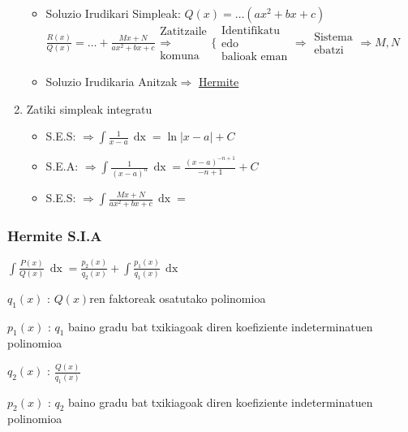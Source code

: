 \documentclass[8pt]{article}
\DeclareMathOperator{\xder}{\, \mathrm{d}x}
\begin{document}
\begin{enumerate}
\begin{itemize}
						\item Soluzio Irudikari Simpleak: $ Q(x) = \dots (a x^2 + b x + c) $
							$ \frac{R(x)}{Q(x)} = \dots +
							\frac{Mx + N}{a x^2 + b x + c}
							\begin{array}{c}
								\text{Zatitzaile}\\
								\Rightarrow\\
								\text{komuna}
							\end{array}
							\Bigg \{
							\begin{array}{c}
								\text{Identifikatu}\\
								\text{edo}\\
								\text{balioak eman}
							\end{array}
							\Rightarrow
							\begin{array}{c}
								\text{Sistema}\\
								\text{ebatzi}
							\end{array} \Rightarrow M, N $
						\item Soluzio Irudikaria Anitzak$ \Rightarrow $ \underline{Hermite}
					\end{itemize} 

				\item Zatiki simpleak integratu
					\begin{itemize}
						\item S.E.S: $ \Rightarrow \int \frac{1}{x-a} \xder = \ln |x-a| + C $
						\item S.E.A: $ \Rightarrow \int \frac{1}{(x-a)^n} \xder = \frac{(x-a)^{-n+1}}{-n+1} + C $
						\item S.E.S: $ \Rightarrow \int \frac{Mx+N}{a x^2 + b x + c} \xder = $
					\end{itemize}

			\end{enumerate}
		\subsubsection{Hermite S.I.A}
			$ \int \frac{P(x)}{Q(x)} \xder = \frac{p_2 (x)}{q_2 (x)} + \int \frac{p_1 (x)}{q_1 (x)} \xder $

			$ q_1 (x) $ : $ Q(x)$ren faktoreak osatutako polinomioa

			$ p_1 (x) $ : $ q_1 $ baino gradu bat txikiagoak diren koefiziente indeterminatuen polinomioa

			$ q_2 (x) $ : $ \frac{Q(x)}{q_1 (x)} $

			$ p_2 (x) $ : $ q_2 $ baino gradu bat txikiagoak diren koefiziente indeterminatuen polinomioa
\end{document}
